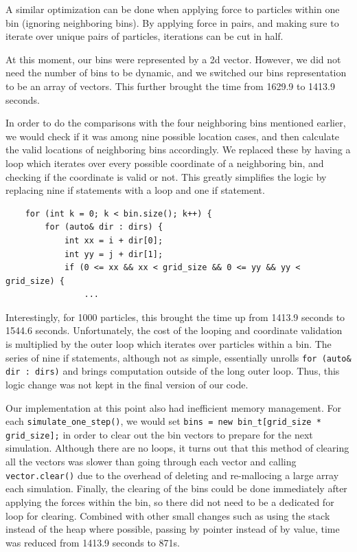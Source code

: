 \documentclass{article}
\begin{document}
A similar optimization can be done when applying force to particles within one bin (ignoring neighboring bins). By applying force in pairs, and making sure to iterate over unique pairs of particles, iterations can be cut in half.

At this moment, our bins were represented by a 2d vector. However, we did not need the number of bins to be dynamic, and we switched our bins representation to be an array of vectors. This further brought the time
from 1629.9 to 1413.9 seconds.

In order to do the comparisons with the four neighboring bins mentioned earlier, we would check if it
was among nine possible location cases, and then calculate the valid locations of neighboring bins accordingly. We replaced these by having a loop which iterates over every possible coordinate of a neighboring bin, and checking if the coordinate is valid or not. This greatly simplifies the logic by replacing nine if statements with a loop and one if statement.

\begin{verbatim}
    for (int k = 0; k < bin.size(); k++) {
        for (auto& dir : dirs) {
            int xx = i + dir[0];
            int yy = j + dir[1];
            if (0 <= xx && xx < grid_size && 0 <= yy && yy < grid_size) {
                ...
\end{verbatim}

Interestingly, for 1000 particles, this brought the time up from 1413.9 seconds to 1544.6 seconds. Unfortunately,
the cost of the looping and coordinate validation is multiplied by the outer loop which iterates over particles within a bin. The series of nine if statements, although not as simple, essentially unrolls \verb|for (auto& dir : dirs)| and brings computation 
outside of the long outer loop. Thus, this logic change was not kept in the final version of our code.



Our implementation at this point also had inefficient memory management. For each \verb|simulate_one_step()|, we would set \verb|bins = new bin_t[grid_size * grid_size];| in order to clear out the bin vectors to prepare for the next simulation. Although
there are no loops, it turns out that this method of clearing all the vectors was slower than going through each vector and calling
\verb|vector.clear()| due to the overhead of deleting and re-mallocing a large array each simulation. Finally, the clearing of the bins
could be done immediately after applying the forces within the bin, so there did not need to be a dedicated
for loop for clearing. Combined with other small changes such as using the stack instead of the heap
where possible, passing by pointer instead of by value, time was reduced from 1413.9 seconds to 871s.
\end{document}
